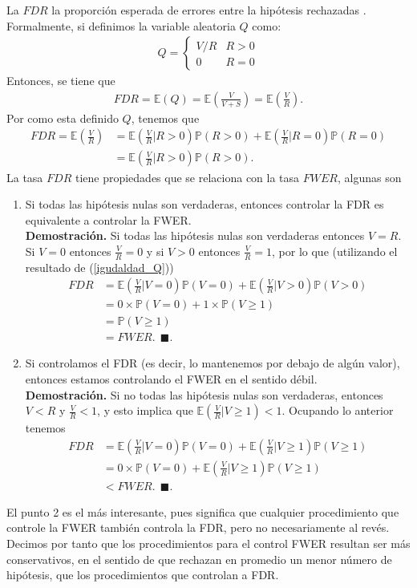 \documentclass[11pt,letterpaper]{article}
\newcommand{\mP}{\mathbb{P}}
\newcommand{\mE}{\mathbb{E}}
\newcommand{\finf}{\blacksquare.}
\begin{document}
La $FDR$  la proporción esperada de errores entre la hipótesis rechazadas \cite{Benjamini1995} . Formalmente, si definimos la variable aleatoria $Q$ como:
\begin{align} \label{e_fdr}
Q=\left\{ \begin{array}{cc}
V/R & R>0\\
0 & R=0
\end{array} \right.
\end{align}
Entonces, se tiene que 
\begin{align*}
FDR = \mE(Q)=\mE\left( \frac{V}{V+S}\right)=\mE\left( \frac{V}{R} \right).
\end{align*}
Por como esta definido $Q$, tenemos que 
\begin{align}\label{igudaldad_Q}
FDR=\mE\left( \frac{V}{R} \right) &= \mE\left( \frac{V}{R}\left| R>0\right. \right)\mP(R>0)+\mE\left( \frac{V}{R}\left| R=0\right. \right)\mP(R=0)\\
&= \mE\left( \frac{V}{R}\left| R>0\right. \right)\mP(R>0).
\end{align}
La tasa $FDR$ tiene propiedades que se relaciona con la tasa $FWER$, algunas son
\begin{enumerate}
\item Si todas las hipótesis nulas son verdaderas, entonces controlar la FDR es equivalente a controlar la FWER. \\
\textbf{Demostración.} Si todas las hipótesis nulas son verdaderas entonces $V=R$. Si $V=0$ entonces $\frac{V}{R}=0$ y si $V>0$ entonces $\frac{V}{R}=1$, por lo que (utilizando el resultado de (\ref{igudaldad_Q}))
\begin{align*}
FDR &= \mE\left( \frac{V}{R}\left| V=0\right. \right)\mP(V=0)+\mE\left( \frac{V}{R}\left| V>0\right. \right)\mP(V>0)\\
&=0\times \mP(V=0)+1\times \mP(V\geq 1)\\
&= \mP(V\geq 1)\\
&= FWER.\ \ \finf
\end{align*}

\item  Si controlamos el FDR (es decir, lo mantenemos por debajo de algún valor), entonces estamos controlando el FWER en el sentido débil. \\
\textbf{Demostración.} Si no todas las hipótesis nulas son verdaderas, entonces $V<R$ y  $\frac{V}{R}<1$, y esto implica que $\mE\left( \frac{V}{R} |V\geq 1\right)<1$. Ocupando lo anterior tenemos
\begin{align*}
FDR&= \mE\left( \frac{V}{R}\left| V=0\right. \right)\mP(V=0)+\mE\left( \frac{V}{R}\left| V\geq 1\right. \right)\mP(V\geq 1)\\
&=0\times \mP(V=0)+\mE\left( \frac{V}{R}\left| V\geq 1\right. \right)\mP(V\geq 1)\\
&<FWER.\ \ \finf
\end{align*}

\end{enumerate}
El punto 2 es el más interesante, pues significa que cualquier procedimiento que controle la FWER también controla la FDR, pero no necesariamente al revés. Decimos por tanto que los procedimientos para el control FWER resultan ser más conservativos, en el sentido de que rechazan en promedio un menor número de hipótesis, que los procedimientos que controlan a FDR. 
\end{document}
